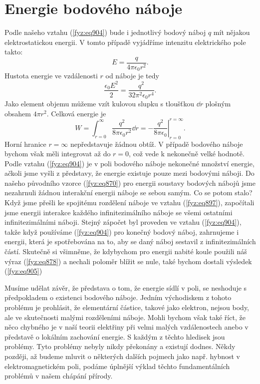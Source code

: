   \section{Energie bodového náboje}\label{fyz:IIchapVIsecVI}
    Podle našeho vztahu (\ref{fyz:eq904}) bude i jednotlivý bodový náboj \(q\) mít nějakou
    elektrostatickou energii. V tomto případě vyjádříme intenzitu elektrického pole takto:
    \begin{equation*}
      E=\dfrac{q}{4πϵ_0r^2}.
    \end{equation*}
    Hustota energie ve vzdálenosti \(r\) od náboje je tedy
    \begin{equation*}
      \dfrac{ϵ_0E^2}{2}=\dfrac{q^2}{32π^2ϵ_0r^4}.
    \end{equation*}
    Jako element objemu můžeme vzít kulovou slupku s tloušťkou \(\dd{r}\) plošným obsahem \(4πr^2\).
    Celková energie je
    \begin{equation}\label{fyz:eq905}
      W=\int_{r=0}^∞\dfrac{q^2}{8πϵ_0r^2}\dd{r}=−\left.\dfrac{q^2}{8πϵ_0}\right\rvert^{r=∞}_{r=0}.
    \end{equation}
    Horní hranice \(r=∞\) nepředstavuje žádnou obtíž. V případě bodového náboje bychom však měli
    integrovat až do \(r = 0\), což vede k nekonečně velké hodnotě. Podle vztahu (\ref{fyz:eq904})
    je v poli bodového náboje nekonečné množství energie, ačkoli jsme vyšli z představy, že energie
    existuje pouze mezi bodovými náboji. Do našeho původního vzorce (\ref{fyz:eq870}) pro energii
    soustavy bodových nábojů jsme nezahrnuli žádnou interakční energii náboje se sebou samým. Co se
    potom stalo? Když jsme přešli ke spojitému rozdělení náboje ve vztahu (\ref{fyz:eq897}),
    započítali jsme energii interakce každého infinitezimálního náboje se všemi ostatními
    infinitezimálními náboji. Stejný zápočet byl proveden ve vztahu (\ref{fyz:eq904}), takže když
    používáme (\ref{fyz:eq904}) pro konečný bodový náboj, zahrnujeme i energii, která je
    spotřebována na to, aby se daný náboj sestavil z infinitezimálních částí. Skutečně si všimněme,
    že kdybychom pro energii nabité koule použili náš výraz (\ref{fyz:eq878}) a nechali poloměr
    blížit se nule, také bychom dostali výsledek (\ref{fyz:eq905})

    Musíme udělat závěr, že představa o tom, že energie sídlí v poli, se neshoduje s předpokladem o
    existenci bodového náboje. Jedním východiskem z tohoto problému je prohlásit, že elementární
    částice, takové jako elektron, nejsou body, ale ve skutečnosti malými rozděleními náboje. Mohli
    bychom však také říct, že něco chybného je v naší teorii elektřiny při velmi malých
    vzdálenostech anebo v představě o lokálním zachování energie. S každým z těchto hledisek jsou
    problémy. Tyto problémy nebyly nikdy překonány a existují dodnes. Někdy později, až budeme
    mluvit o některých dalších pojmech jako např. hybnost v elektromagnetickém poli, podáme úplnější
    výklad těchto fundamentálních problémů v našem chápání přírody.